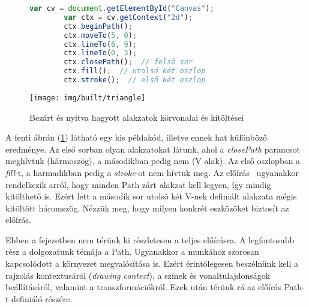 \documentclass[12pt]{report}
\theoremstyle{definition}
\newcommand{\inenglish}[1]{\textsl{#1}}
\begin{document}
  \begin{figure}[!htb]
    \hspace{0.1\textwidth}
      \centering
      \begin{lstlisting}[language=JavaScript, autogobble=true]
        var cv = document.getElementById("Canvas");
        var ctx = cv.getContext("2d");
        ctx.beginPath();
        ctx.moveTo(5, 0);
        ctx.lineTo(6, 9);
        ctx.lineTo(0, 3);
        ctx.closePath();  // felső sor
        ctx.fill();  // utolsó két oszlop
        ctx.stroke();  // első két oszlop
      \end{lstlisting}
%      
    \endminipage
    \hfill
      \texttt{[image: img/built/triangle]}
    \endminipage
    \caption{\label{triangles-code-and-image} Bezárt és nyitva hagyott
    alakzatok körvonalai és kitöltései }
  \end{figure}

A fenti ábrán (\ref{triangles-code-and-image}) látható egy kis példakód,
illetve ennek hat különböző eredménye. Az első sorban olyan alakzatokat látunk,
ahol a \emph{closePath} parancsot meghívtuk (hármoszög), a másodikban pedig nem
(V alak). Az első oszlopban a \emph{fill}-t, a harmadikban pedig a
\emph{stroke}-ot nem hívtuk meg. Az előírás~\cite{Cabanier:14:HCC} ugyanakkor
rendelkezik arról, hogy minden Path zárt alakzat kell legyen, így mindig
kitölthető is. Ezért lett a második sor utolsó két V-nek definiált alakzata
mégis kitöltött háromszög. Nézzük meg, hogy milyen konkrét eszközöket biztosít
az előírás.

Ebben a fejezetben nem térünk ki részletesen a teljes előírásra. A legfontosabb
rész a dolgozatunk témája a Path. Ugyanakkor a munkához szorosan kapcsolódott a
környezet megvalósítása is. Ezért érintőlegesen beszélnünk kell a rajzolás
kontextusáról (\inenglish{drawing context}), a színek és vonaltulajdonságok
beállításáról, valamint a transzformációkról. Ezek után térünk rá az előírás
Path-t definiáló részére.
\end{document}
